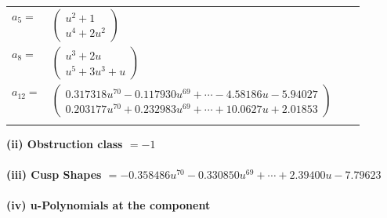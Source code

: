 \documentclass[1p]{elsarticle_modified}
\theoremstyle{definition}
\begin{document}
\begin{tabular}{m{7pt} m{180pt} m{7pt} m{180pt} }
\flushright $a_{5}=$&$\begin{pmatrix}u^2+1\\u^4+2 u^2\end{pmatrix}$ \\
\flushright $a_{8}=$&$\begin{pmatrix}u^3+2 u\\u^5+3 u^3+u\end{pmatrix}$ \\
\flushright $a_{12}=$&$\begin{pmatrix}0.317318 u^{70}-0.117930 u^{69}+\cdots-4.58186 u-5.94027\\0.203177 u^{70}+0.232983 u^{69}+\cdots+10.0627 u+2.01853\end{pmatrix}$\\&\end{tabular}
\flushleft \textbf{(ii) Obstruction class $= -1$}\\~\\
\flushleft \textbf{(iii) Cusp Shapes $= -0.358486 u^{70}-0.330850 u^{69}+\cdots+2.39400 u-7.79623$}\\~\\
\newpage\renewcommand{\arraystretch}{1}
\flushleft \textbf{(iv) u-Polynomials at the component}\newline \\
\end{document}
